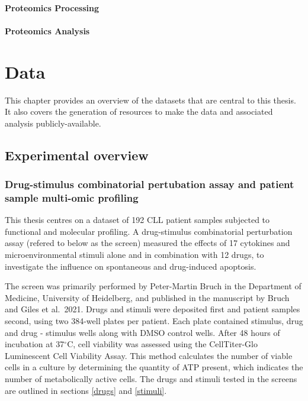\documentclass[11pt, a4paper, twosided]{book}
\begin{document}
\hypertarget{proteomics-processing}{%
\subsubsection{Proteomics Processing}\label{proteomics-processing}}

\hypertarget{proteomics-analysis}{%
\subsubsection{Proteomics Analysis}\label{proteomics-analysis}}

\hypertarget{data}{%
\chapter{Data}\label{data}}

This chapter provides an overview of the datasets that are central to this thesis. It also covers the generation of resources to make the data and associated analysis publicly-available.

\hypertarget{experimental-overview}{%
\section{Experimental overview}\label{experimental-overview}}

\hypertarget{drug-stimulus-combinatorial-pertubation-assay-and-patient-sample-multi-omic-profiling}{%
\subsection{Drug-stimulus combinatorial pertubation assay and patient sample multi-omic profiling}\label{drug-stimulus-combinatorial-pertubation-assay-and-patient-sample-multi-omic-profiling}}

This thesis centres on a dataset of 192 CLL patient samples subjected to functional and molecular profiling. A drug-stimulus combinatorial perturbation assay (refered to below as the screen) measured the effects of 17 cytokines and microenvironmental stimuli alone and in combination with 12 drugs, to investigate the influence on spontaneous and drug-induced apoptosis.

The screen was primarily performed by Peter-Martin Bruch in the Department of Medicine, University of Heidelberg, and published in the manuscript by Bruch and Giles et al.~2021. Drugs and stimuli were deposited first and patient samples second, using two 384-well plates per patient. Each plate contained stimulus, drug and drug - stimulus wells along with DMSO control wells. After 48 hours of incubation at 37\(^\circ\)C, cell viability was assessed using the CellTiter-Glo Luminescent Cell Viability Assay. This method calculates the number of viable cells in a culture by determining the quantity of ATP present, which indicates the number of metabolically active cells. The drugs and stimuli tested in the screens are outlined in sections \ref{drugs} and \ref{stimuli}.
\end{document}
